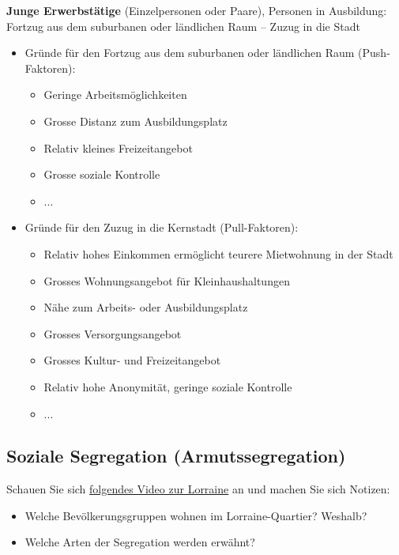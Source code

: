 \begin{myexercise}
\begin{myanswer}
\textbf{Junge Erwerbstätige} (Einzelpersonen oder Paare), Personen in Ausbildung: Fortzug aus dem suburbanen oder ländlichen Raum -- Zuzug in die Stadt
    \begin{itemize}
        \item Gründe für den Fortzug aus dem suburbanen oder ländlichen Raum (Push-Faktoren):
        \begin{itemize}
            \item Geringe Arbeitsmöglichkeiten
            \item Grosse Distanz zum Ausbildungsplatz
            \item Relativ kleines Freizeitangebot
            \item Grosse soziale Kontrolle
            \item ...
        \end{itemize}
        \item Gründe für den Zuzug in die Kernstadt (Pull-Faktoren):
        \begin{itemize}
            \item Relativ hohes Einkommen ermöglicht teurere Mietwohnung in der Stadt
            \item Grosses Wohnungsangebot für Kleinhaushaltungen
            \item Nähe zum Arbeits- oder Ausbildungsplatz
            \item Grosses Versorgungsangebot
            \item Grosses Kultur- und Freizeitangebot
            \item Relativ hohe Anonymität, geringe soziale Kontrolle
            \item ...
        \end{itemize}
    \end{itemize}
\end{myanswer}

\end{myexercise}

\subsection{Soziale Segregation (Armutssegregation)}
\begin{mychallenge}
Schauen Sie sich \href{https://www.srf.ch/play/tv/bericht-vor-8/video/lorraine-quartier-bern?urn=urn:srf:video:0f1c7427-65b7-4ebf-a9ff-c595d08ba1df}{folgendes Video zur Lorraine} an und machen Sie sich Notizen:
\begin{itemize}
\item Welche Bevölkerungsgruppen wohnen im Lorraine-Quartier? Weshalb?
\item Welche Arten der Segregation werden erwähnt?
\end{itemize}

\end{mychallenge}

